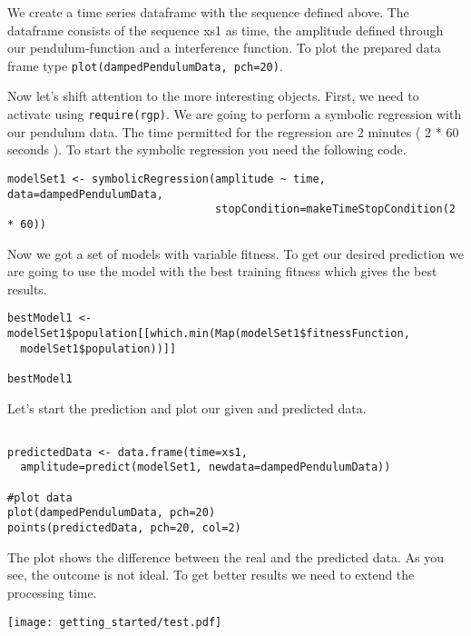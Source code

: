 We create a time series dataframe with the sequence defined above. 
The dataframe consists of the sequence xs1 as time, the amplitude defined through our pendulum-function and a
interference function.
To plot the prepared data frame type \lstinline!plot(dampedPendulumData, pch=20)!.

Now let's shift attention to the more interesting objects.
First, we need to activate \RGP using \lstinline!require(rgp)!.
We are going to perform a symbolic regression with our pendulum data.
The time permitted for the regression are 2 minutes ( 2 * 60 seconds ).
To start the symbolic regression you need the following code.

\begin{lstlisting}[caption = {Symbolic Regression }, label = tutsymbolicregression]
modelSet1 <- symbolicRegression(amplitude ~ time, data=dampedPendulumData,
                                stopCondition=makeTimeStopCondition(2 * 60))
\end{lstlisting}

Now we got a set of models with variable fitness. 
To get our desired prediction we are going to use the model with the best training fitness
which gives the best results.

\begin{lstlisting}[caption = {Best Model}, label = tutbestmodel]
bestModel1 <- modelSet1$population[[which.min(Map(modelSet1$fitnessFunction, 
  modelSet1$population))]]

bestModel1
\end{lstlisting}

Let's start the prediction and plot our given and predicted data. 

\begin{lstlisting}[caption = {Prediction}, label = tutPrediction]

predictedData <- data.frame(time=xs1,
  amplitude=predict(modelSet1, newdata=dampedPendulumData))

#plot data
plot(dampedPendulumData, pch=20)
points(predictedData, pch=20, col=2)

\end{lstlisting}

The plot shows the difference between the real and the predicted data. 
As you see, the outcome is not ideal. To get better results we need to extend the processing time.

\begin{figure*}[h]
  \texttt{[image: getting\_started/test.pdf]}
  \caption{This figure shows how to add figures to \LaTeX documents.}
  \label{fig:test}
\end{figure*}
